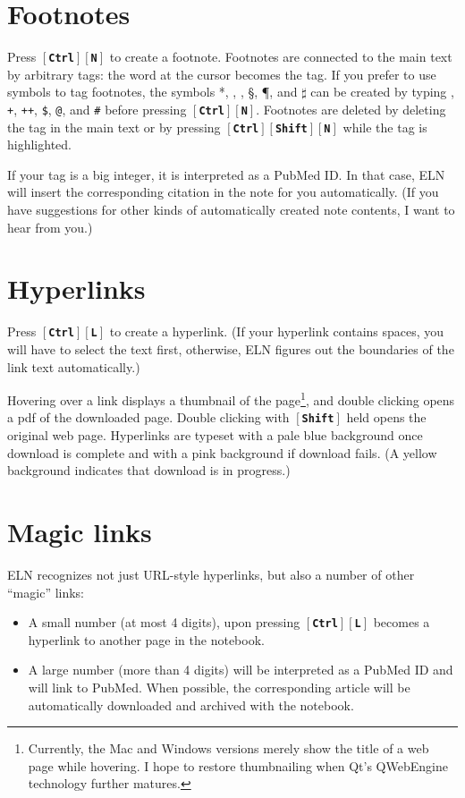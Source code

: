 \documentclass[11pt]{report}
\def\keystroke#1{$\left[\right.\!${\tt\bfseries #1}$\!\left.\right]$}
\def\key#1{\keystroke{#1}}
\def\keycombo#1#2{\keystroke{#1}\keystroke{#2}}
\def\keycontrol#1{\keycombo{Ctrl}{#1}}
\def\controlshift#1{\keystroke{Ctrl}\keystroke{Shift}\keystroke{#1}}
\begin{document}
\section{Footnotes}

Press \keycontrol{N} to create a footnote. Footnotes are connected
to the main text by arbitrary tags: the word at the cursor
becomes the tag.  If you prefer to use symbols to tag footnotes, the
symbols *, \dag, \ddag, \S, \P, and $\sharp$  can be created by
typing {\tt *}, {\tt +}, {\tt ++}, {\tt\$}, {\tt @}, and
{\tt \#} before pressing \keycontrol{N}. Footnotes are deleted by deleting the tag in the main
text or by pressing \controlshift{N} while the tag is
highlighted.

If your tag is a big integer, it is interpreted as a PubMed ID. In
that case, ELN will insert the corresponding citation in the note for
you automatically. (If you have suggestions for other kinds of
automatically created note contents, I want to hear from you.)

\section{Hyperlinks}

Press \keycontrol{L} to create a hyperlink. (If your hyperlink
contains spaces, you will have to select the text first, otherwise,
ELN figures out the boundaries of the link text automatically.)

Hovering over a link displays a thumbnail of the
page\footnote{Currently, the Mac and Windows versions merely show the
  title of a web page while hovering. I hope to restore thumbnailing
  when Qt's QWebEngine technology further matures.}, and double
clicking opens a pdf of the downloaded page. Double clicking with
 \key{Shift} held opens the original web
page. Hyperlinks are typeset with a pale blue background once download
is complete and with a pink background if download fails. (A yellow
background indicates that download is in progress.)

\section{Magic links}

ELN recognizes not just URL-style hyperlinks, but also a number of
other ``magic'' links:
\begin{itemize}
\item A small number (at most 4 digits), upon pressing \keycontrol{L}
becomes a hyperlink to another page in the notebook.
\item A large number (more than 4 digits)
will be interpreted as a PubMed ID and will link to PubMed. When
possible, the corresponding article will be automatically downloaded
and archived with the notebook. 
\end{itemize}
\end{document}
